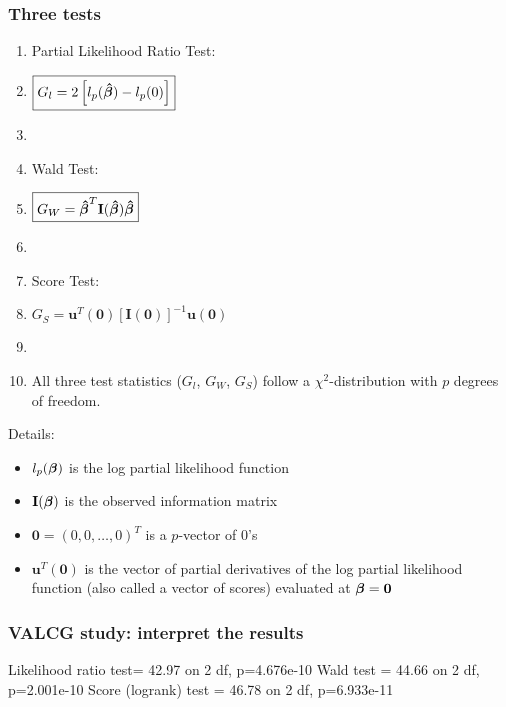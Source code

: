 \begin{frame}
\frametitle{Three tests}
\hspace*{-0.3in}
\begin{minipage}{0.55\textwidth}
\begin{enumerate}
\item Partial Likelihood Ratio Test:
\item[] $\displaystyle \boxed{G_l=2\left[l_p({\boldmath \mbox{$\hat{\beta}$}})-l_p(\boldmath{0})\right]}$
\item[]
\item Wald Test:
\item[] $\displaystyle \boxed{G_W={\boldmath\mbox{$\hat{\beta}$}}^T\mathbf{I}({\boldmath
    \mbox{$\hat{\beta}$}}){\boldmath \mbox{$\hat{\beta}$}}}$
\item[]
\item Score Test:
\item[] $\displaystyle \boxed{G_S=\mathbf{u}^T(\mathbf{0})[\mathbf{I}(\mathbf{0})]^{-1}\mathbf{u}(\mathbf{0})}$
\item[]
\item[] All three test statistics ($G_l$, $G_W$, $G_S$) follow a $\chi^2$-distribution with $p$ degrees of freedom.
\end{enumerate}
\end{minipage}
\blankcolumn
\begin{minipage}{0.40\textwidth}
Details:
\begin{itemize}
\item $l_p({\boldmath\mbox{$\beta$}})$ is the log partial likelihood function
\item $\mathbf{I}({\boldmath \mbox{${\beta}$}})$ is the observed information matrix 
\item $\mathbf{0}=(0,0,\ldots,0)^T$ is a $p$-vector of 0's
\item $\mathbf{u}^T(\mathbf{0})$ is the vector of partial
    derivatives of the log partial likelihood function (also called a
    vector of scores) evaluated at ${\boldmath
    \mbox{${\beta}$}}=\mathbf{0}$
\end{itemize}
\end{minipage}
\end{frame}

\begin{frame}[fragile]
\frametitle{VALCG study: interpret the results}
\begin{Rout}{.0}
Likelihood ratio test= 42.97  on 2 df,   p=4.676e-10
Wald test            = 44.66  on 2 df,   p=2.001e-10
Score (logrank) test = 46.78  on 2 df,   p=6.933e-11
\end{Rout}
\vskip200pt
\end{frame}

